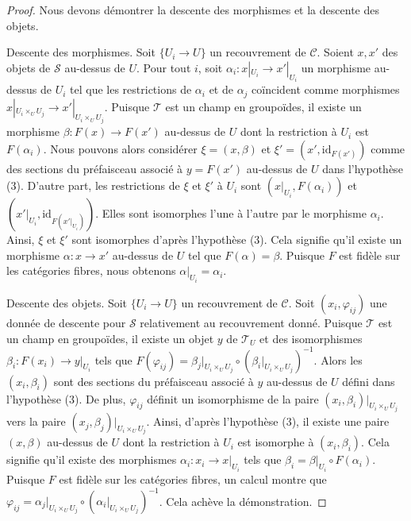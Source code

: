 \begin{proof}
Nous devons démontrer la descente des morphismes et la descente des objets.

\medskip\noindent
Descente des morphismes. Soit $\{U_i \to U\}$ un recouvrement de $\mathcal{C}$.
Soient $x, x'$ des objets de $\mathcal{S}$ au-dessus de $U$. Pour tout $i$,
soit $\alpha_i : x|_{U_i} \to x'|_{U_i}$ un morphisme au-dessus de $U_i$
tel que les restrictions de $\alpha_i$ et de $\alpha_j$ coïncident comme morphismes
$x|_{U_i \times_U U_j} \to x'|_{U_i \times_U U_j}$.
Puisque $\mathcal{T}$ est un champ en groupoïdes, il existe un morphisme
$\beta : F(x) \to F(x')$ au-dessus de $U$ dont la restriction à $U_i$ est $F(\alpha_i)$.
Nous pouvons alors considérer $\xi = (x, \beta)$ et $\xi' = (x', \text{id}_{F(x')})$
comme des sections du préfaisceau associé à $y = F(x')$ au-dessus de $U$
dans l'hypothèse (3). D'autre part, les restrictions de
$\xi$ et $\xi'$ à $U_i$ sont $(x|_{U_i}, F(\alpha_i))$
et $(x'|_{U_i}, \text{id}_{F(x'|_{U_i})})$.
Elles sont isomorphes l'une à l'autre par le morphisme $\alpha_i$.
Ainsi, $\xi$ et $\xi'$ sont isomorphes d'après l'hypothèse (3). Cela signifie qu'il existe un
morphisme $\alpha : x \to x'$ au-dessus de $U$ tel que $F(\alpha) = \beta$.
Puisque $F$ est fidèle sur les catégories fibres, nous obtenons
$\alpha|_{U_i} = \alpha_i$.

\medskip\noindent
Descente des objets. Soit $\{U_i \to U\}$ un recouvrement de $\mathcal{C}$.
Soit $(x_i, \varphi_{ij})$ une donnée de descente pour $\mathcal{S}$
relativement au recouvrement donné. Puisque $\mathcal{T}$ est un champ en groupoïdes,
il existe un objet $y$ de $\mathcal{T}_U$ et des isomorphismes
$\beta_i : F(x_i) \to y|_{U_i}$ tels que
$F(\varphi_{ij}) = \beta_j|_{U_i \times_U U_j} \circ
(\beta_i|_{U_i \times_U U_j})^{-1}$.
Alors les $(x_i, \beta_i)$ sont des sections du préfaisceau associé à
$y$ au-dessus de $U$ défini dans l'hypothèse (3).
De plus, $\varphi_{ij}$ définit un isomorphisme
de la paire $(x_i, \beta_i)|_{U_i \times_U U_j}$ vers
la paire $(x_j, \beta_j)|_{U_i \times_U U_j}$.
Ainsi, d'après l'hypothèse (3), il existe une paire $(x, \beta)$ au-dessus de $U$
dont la restriction à $U_i$ est isomorphe à $(x_i, \beta_i)$.
Cela signifie qu'il existe des morphismes $\alpha_i : x_i \to x|_{U_i}$
tels que $\beta_i = \beta|_{U_i} \circ F(\alpha_i)$.
Puisque $F$ est fidèle sur les catégories fibres, un calcul montre
que $\varphi_{ij} = \alpha_j|_{U_i \times_U U_j} \circ
(\alpha_i|_{U_i \times_U U_j})^{-1}$. Cela achève la démonstration.
\end{proof}










